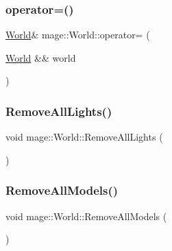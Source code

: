 \hypertarget{classmage_1_1_world_a0440e945dfd0291174ce6dc33e5d8335}{}\label{classmage_1_1_world_a0440e945dfd0291174ce6dc33e5d8335} 
\subsubsection{\texorpdfstring{operator=()}{operator=()}\hspace{0.1cm}{\footnotesize\ttfamily [2/2]}}
{\footnotesize\ttfamily \hyperlink{classmage_1_1_world}{World}\& mage\+::\+World\+::operator= (\begin{DoxyParamCaption}\item[{\hyperlink{classmage_1_1_world}{World} \&\&}]{world }\end{DoxyParamCaption})\hspace{0.3cm}{\ttfamily [delete]}}

\hypertarget{classmage_1_1_world_a5fafe529414d511e88b98ccd8e2f951f}{}\label{classmage_1_1_world_a5fafe529414d511e88b98ccd8e2f951f} 
\subsubsection{\texorpdfstring{Remove\+All\+Lights()}{RemoveAllLights()}}
{\footnotesize\ttfamily void mage\+::\+World\+::\+Remove\+All\+Lights (\begin{DoxyParamCaption}{ }\end{DoxyParamCaption})\hspace{0.3cm}{\ttfamily [private]}}

\hypertarget{classmage_1_1_world_af3bae7b62192de9edda5e0567b73be93}{}\label{classmage_1_1_world_af3bae7b62192de9edda5e0567b73be93} 
\subsubsection{\texorpdfstring{Remove\+All\+Models()}{RemoveAllModels()}}
{\footnotesize\ttfamily void mage\+::\+World\+::\+Remove\+All\+Models (\begin{DoxyParamCaption}{ }\end{DoxyParamCaption})\hspace{0.3cm}{\ttfamily [private]}}


